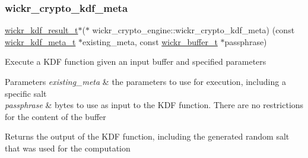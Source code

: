 \subsubsection{\texorpdfstring{wickr\+\_\+crypto\+\_\+kdf\+\_\+meta}{wickr\_crypto\_kdf\_meta}}
{\footnotesize\ttfamily \hyperlink{structwickr__kdf__result}{wickr\+\_\+kdf\+\_\+result\+\_\+t}$\ast$($\ast$ wickr\+\_\+crypto\+\_\+engine\+::wickr\+\_\+crypto\+\_\+kdf\+\_\+meta) (const \hyperlink{structwickr__kdf__meta}{wickr\+\_\+kdf\+\_\+meta\+\_\+t} $\ast$existing\+\_\+meta, const \hyperlink{structwickr__buffer}{wickr\+\_\+buffer\+\_\+t} $\ast$passphrase)}

Execute a K\+DF function given an input buffer and specified parameters


\begin{DoxyParams}{Parameters}
{\em existing\+\_\+meta} & the parameters to use for execution, including a specific salt \\
\hline
{\em passphrase} & bytes to use as input to the K\+DF function. There are no restrictions for the content of the buffer \\
\hline
\end{DoxyParams}
\begin{DoxyReturn}{Returns}
the output of the K\+DF function, including the generated random salt that was used for the computation 
\end{DoxyReturn}
